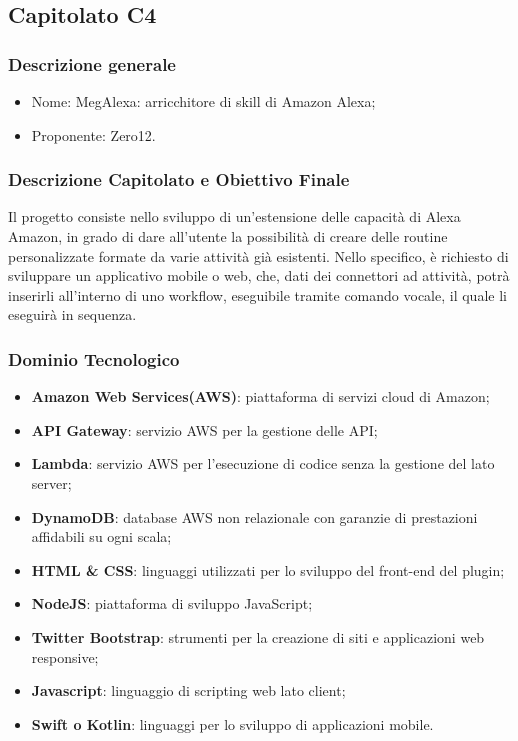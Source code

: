 \subsection{Capitolato C4}

\subsubsection{Descrizione generale}
\begin{itemize}
	\item Nome: MegAlexa: arricchitore di skill di Amazon Alexa;
	\item Proponente: Zero12.
\end{itemize}

\subsubsection{Descrizione Capitolato e Obiettivo Finale}
Il progetto consiste nello sviluppo di un’estensione delle capacità di Alexa Amazon, in grado di dare all’utente la possibilità di creare delle routine personalizzate formate da varie attività già esistenti.
Nello specifico, è richiesto di sviluppare un applicativo mobile o web, che, dati dei connettori ad attività, potrà inserirli all’interno di uno workflow, eseguibile tramite comando vocale, il quale li eseguirà in sequenza.

\subsubsection{Dominio Tecnologico}
\begin{itemize}
	\item \textbf{Amazon Web Services(AWS)}: piattaforma di servizi cloud di Amazon;
	\item \textbf{API Gateway}: servizio AWS per la gestione delle API;
	\item \textbf{Lambda}: servizio AWS per l’esecuzione di codice senza la gestione del lato server;
	\item \textbf{DynamoDB}: database AWS non relazionale con garanzie di prestazioni affidabili su ogni scala;
	\item \textbf{HTML \& CSS}: linguaggi utilizzati per lo sviluppo del front-end del plugin;
	\item \textbf{NodeJS}: piattaforma di sviluppo JavaScript;
	\item \textbf{Twitter Bootstrap}: strumenti per la creazione di siti e applicazioni web responsive;
	\item \textbf{Javascript}: linguaggio di scripting web lato client;
	\item \textbf{Swift o Kotlin}: linguaggi per lo sviluppo di applicazioni mobile.
\end{itemize}

